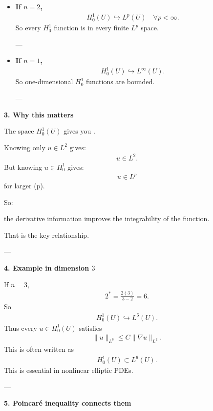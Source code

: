 \documentclass[12pt,a4paper]{report}
\begin{document}
\begin{description}
\begin{description}
\begin{itemize}
---

\item \textbf{If $n=2$,}
\begin{align*}
H_0^1(U)\hookrightarrow L^p(U)
\quad\forall p<\infty.
\end{align*}
So every $H_0^1$ function is in every finite $L^p$ space.

---

\item \textbf{If $n=1$,}
\begin{align*}
H_0^1(U)\hookrightarrow L^\infty(U).
\end{align*}
So one-dimensional $H_0^1$ functions are bounded.

---
\end{itemize}

\item \textbf{3. Why this matters}

The space $H_0^1(U)$ gives you .

Knowing only $u\in L^2$ gives:
\begin{align*}
u\in L^2.
\end{align*}
But knowing $u\in H_0^1$ gives:
\begin{align*}
u\in L^p
\end{align*}
for larger (p).

So:

\> the derivative information improves the integrability of the function.

That is the key relationship.

---

\item \textbf{4. Example in dimension $3$}

If $n=3$,
\begin{align*}
2^*=\frac{2(3)}{3-2}=6.
\end{align*}
So
\begin{align*}
H_0^1(U)\hookrightarrow L^6(U).
\end{align*}
Thus every $u\in H_0^1(U)$ satisfies
\begin{align*}
\|u\|_{L^6}\le C\|\nabla u\|_{L^2}.
\end{align*}
This is often written as
\begin{align*}
H_0^1(U)\subset L^6(U).
\end{align*}
This is essential in nonlinear elliptic PDEs.

---

\item \textbf{5. Poincaré inequality connects them}


\end{description}
\end{description}
\end{document}
